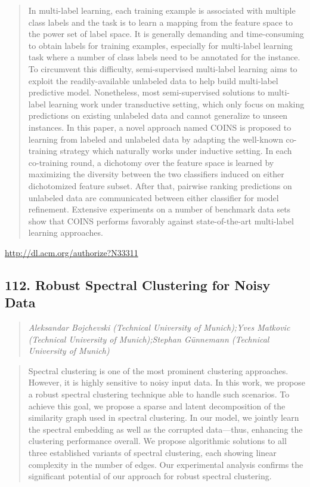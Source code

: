 \documentclass{article}
\begin{document}
\begin{quote}
In multi-label learning, each training example is associated with multiple class labels and the task is to learn a mapping from the feature space to the power set of label space. It is generally demanding and time-consuming to obtain labels for training examples, especially for multi-label learning task where a number of class labels need to be annotated for the instance. To circumvent this difficulty, semi-supervised multi-label learning aims to exploit the readily-available unlabeled data to help build multi-label predictive model. Nonetheless, most semi-supervised solutions to multi-label learning work under transductive setting, which only focus on making predictions on existing unlabeled data and cannot generalize to unseen instances. In this paper, a novel approach named COINS is proposed to learning from labeled and unlabeled data by adapting the well-known co-training strategy which naturally works under inductive setting. In each co-training round, a dichotomy over the feature space is learned by maximizing the diversity between the two classifiers induced on either dichotomized feature subset. After that, pairwise ranking predictions on unlabeled data are communicated between either classifier for model refinement. Extensive experiments on a number of benchmark data sets show that COINS performs favorably against state-of-the-art multi-label learning approaches.
\end{quote}

\href{http://dl.acm.org/authorize?N33311}{http://dl.acm.org/authorize?N33311}

\subsection{112. Robust Spectral Clustering for Noisy Data}

\begin{quote}
\footnotesize{\textit{Aleksandar Bojchevski (Technical University of Munich);Yves Matkovic (Technical University of Munich);Stephan Günnemann (Technical University of Munich)}}

\end{quote}

\begin{quote}
Spectral clustering is one of the most prominent clustering approaches. However, it is highly sensitive to noisy input data. In this work, we propose a robust spectral clustering technique able to handle such scenarios. To achieve this goal, we propose a sparse and latent decomposition of the similarity graph used in spectral clustering. In our model, we jointly learn the spectral embedding as well as the corrupted data—thus, enhancing the clustering performance overall. We propose algorithmic solutions to all three established variants of spectral clustering, each showing linear complexity in the number of edges. Our experimental analysis confirms the significant potential of our approach for robust spectral clustering.
\end{quote}
\end{document}
